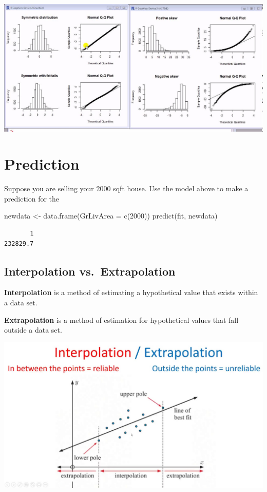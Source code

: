 \documentclass[
  letterpaper,
  DIV=11,
  numbers=noendperiod]{scrartcl}
\newenvironment{Shaded}{\begin{snugshade}}{\end{snugshade}}
\newcommand{\AttributeTok}[1]{\textcolor[rgb]{0.40,0.45,0.13}{#1}}
\newcommand{\DecValTok}[1]{\textcolor[rgb]{0.68,0.00,0.00}{#1}}
\newcommand{\FunctionTok}[1]{\textcolor[rgb]{0.28,0.35,0.67}{#1}}
\newcommand{\NormalTok}[1]{\textcolor[rgb]{0.00,0.23,0.31}{#1}}
\newcommand{\OtherTok}[1]{\textcolor[rgb]{0.00,0.23,0.31}{#1}}
\begin{document}
\includegraphics{118_M_SLR_Notes_files/mediabag/maxresdefault.jpg}

\hypertarget{prediction}{%
\section{Prediction}\label{prediction}}

Suppose you are selling your 2000 sqft house. Use the model above to
make a prediction for the

\begin{Shaded}
\begin{Highlighting}[]
\NormalTok{newdata }\OtherTok{\textless{}{-}} \FunctionTok{data.frame}\NormalTok{(}\AttributeTok{GrLivArea =} \FunctionTok{c}\NormalTok{(}\DecValTok{2000}\NormalTok{))}
\FunctionTok{predict}\NormalTok{(fit, newdata)}
\end{Highlighting}
\end{Shaded}

\begin{verbatim}
       1 
232829.7 
\end{verbatim}

\hypertarget{interpolation-vs.-extrapolation}{%
\subsection{Interpolation
vs.~Extrapolation}\label{interpolation-vs.-extrapolation}}

\textbf{Interpolation} is a method of estimating a hypothetical value
that exists within a data set.

\textbf{Extrapolation} is a method of estimation for hypothetical values
that fall outside a data set.

\includegraphics{118_M_SLR_Notes_files/mediabag/maxresdefault1.jpg}
\end{document}
